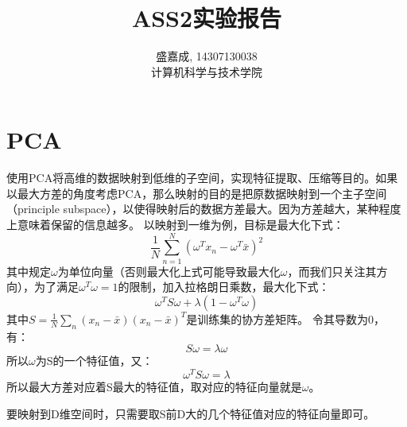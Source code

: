 \documentclass[hyperref,UTF8]{ctexart}
\begin{document}
\title{ASS2实验报告}
\author{盛嘉成, 14307130038 \\ 计算机科学与技术学院}
\maketitle

\section*{PCA}
使用PCA将高维的数据映射到低维的子空间，实现特征提取、压缩等目的。如果以最大方差的角度考虑PCA，那么映射的目的是把原数据映射到一个主子空间（principle subspace），以使得映射后的数据方差最大。因为方差越大，某种程度上意味着保留的信息越多。
以映射到一维为例，目标是最大化下式：
\[\frac{1}{N}\sum_{n=1}^{N}(\omega^T x_n-\omega^T\bar x)^2\]
其中规定$\omega$为单位向量（否则最大化上式可能导致最大化$\omega$，而我们只关注其方向），为了满足$\omega^T\omega=1$的限制，加入拉格朗日乘数，最大化下式：
\[\omega^T S \omega + \lambda(1-\omega^T\omega)\]
其中$S=\frac{1}{N}\sum_{n}(x_n-\bar x)(x_n-\bar x)^T$是训练集的协方差矩阵。
令其导数为0，有：
\[S\omega = \lambda \omega\]
所以$\omega$为S的一个特征值，又：
\[\omega^T S \omega = \lambda\]
所以最大方差对应着S最大的特征值，取对应的特征向量就是$\omega$。
\par 要映射到D维空间时，只需要取S前D大的几个特征值对应的特征向量即可。
\end{document}
